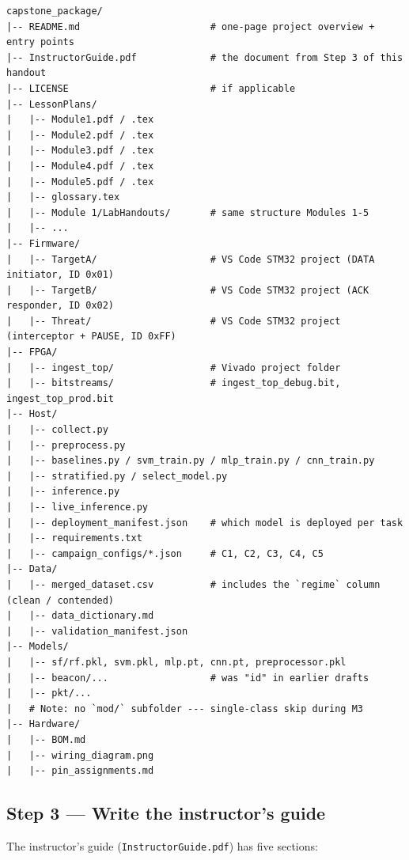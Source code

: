 \documentclass[11pt,letterpaper]{article}
\begin{document}
\begin{lstlisting}[caption={Canonical package layout. Top-level files are the entry points a future user will reach for first.}]
capstone_package/
|-- README.md                       # one-page project overview + entry points
|-- InstructorGuide.pdf             # the document from Step 3 of this handout
|-- LICENSE                         # if applicable
|-- LessonPlans/
|   |-- Module1.pdf / .tex
|   |-- Module2.pdf / .tex
|   |-- Module3.pdf / .tex
|   |-- Module4.pdf / .tex
|   |-- Module5.pdf / .tex
|   |-- glossary.tex
|   |-- Module 1/LabHandouts/       # same structure Modules 1-5
|   |-- ...
|-- Firmware/
|   |-- TargetA/                    # VS Code STM32 project (DATA initiator, ID 0x01)
|   |-- TargetB/                    # VS Code STM32 project (ACK responder, ID 0x02)
|   |-- Threat/                     # VS Code STM32 project (interceptor + PAUSE, ID 0xFF)
|-- FPGA/
|   |-- ingest_top/                 # Vivado project folder
|   |-- bitstreams/                 # ingest_top_debug.bit, ingest_top_prod.bit
|-- Host/
|   |-- collect.py
|   |-- preprocess.py
|   |-- baselines.py / svm_train.py / mlp_train.py / cnn_train.py
|   |-- stratified.py / select_model.py
|   |-- inference.py
|   |-- live_inference.py
|   |-- deployment_manifest.json    # which model is deployed per task
|   |-- requirements.txt
|   |-- campaign_configs/*.json     # C1, C2, C3, C4, C5
|-- Data/
|   |-- merged_dataset.csv          # includes the `regime` column (clean / contended)
|   |-- data_dictionary.md
|   |-- validation_manifest.json
|-- Models/
|   |-- sf/rf.pkl, svm.pkl, mlp.pt, cnn.pt, preprocessor.pkl
|   |-- beacon/...                  # was "id" in earlier drafts
|   |-- pkt/...
|   # Note: no `mod/` subfolder --- single-class skip during M3
|-- Hardware/
|   |-- BOM.md
|   |-- wiring_diagram.png
|   |-- pin_assignments.md
\end{lstlisting}

\subsection{Step 3 --- Write the instructor's guide}
The instructor's guide (\texttt{InstructorGuide.pdf}) has five sections:
\end{document}
